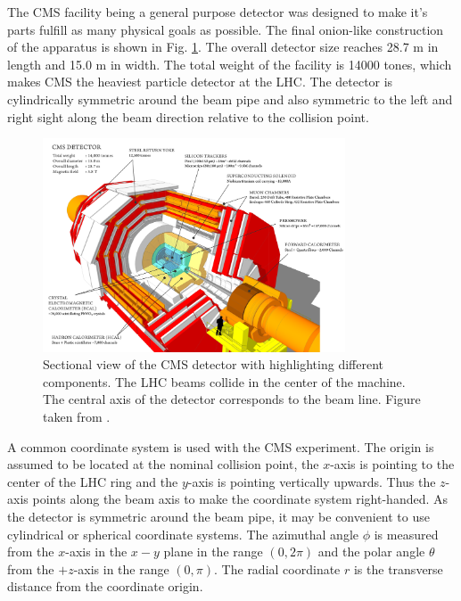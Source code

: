 The CMS facility being a general purpose detector was designed to make it's parts fulfill as many physical goals as possible.
The final onion-like construction of the apparatus is shown in Fig. \ref{fig:CMSview}. The overall detector size reaches 28.7 m in length
and 15.0 m in width. The total weight of the facility is 14000 tones, which makes CMS the heaviest particle detector at the
LHC. The detector is cylindrically symmetric around the beam pipe and also symmetric to the left and right sight along the beam direction
relative to the collision point.

\begin{figure}
  \centering
  \includegraphics[width=0.8\textwidth]{02_experimental_setup/plots/cms_120918_03.png}
  \caption{Sectional view of the CMS detector with highlighting different components. 
  The LHC beams collide in the center of the machine. The central axis of the detector 
  corresponds to the beam line. Figure taken from \cite{Sakuma:2013jqa}.}
  \label{fig:CMSview}
\end{figure}

A common coordinate system is used with the CMS experiment. The origin  
is assumed to be located at the nominal collision point, the $x$-axis is pointing to the center of the 
LHC ring and the $y$-axis is pointing vertically upwards. Thus the $z$-axis points along the beam axis to make
the coordinate system right-handed. As the detector is symmetric around the beam pipe, it may be convenient to use cylindrical or spherical
coordinate systems. The azimuthal angle $\phi$ is measured from the $x$-axis in the $x-y$ plane in the range $(0, 2\pi)$ 
and the polar angle $\theta$ from the $+z$-axis in the range $(0, \pi)$. The radial coordinate $r$ is the transverse distance from the coordinate origin. 

